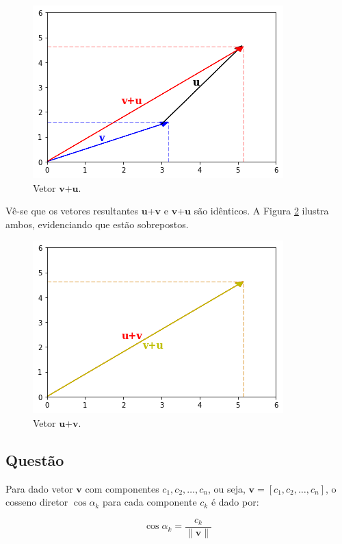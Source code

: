 \documentclass[a4paper,11pt,pagenumber=true]{article}
\newcommand{\vecu}{$\mathbf{u}$}
\newcommand{\vecv}{$\mathbf{v}$}
\newcommand{\vecnorm}[1]{\|\mathbf{#1}\|}
\theoremstyle{mytheor}
\begin{document}
            \begin{figure}[h]
            \centering
               \includegraphics[width=.5\textwidth]{images/q1-3.png}
                \caption{Vetor \vecv+\vecu.}
                \label{fig:q1-3}    
            \end{figure}
            
            Vê-se que os vetores resultantes \vecu+\vecv{} e \vecv+\vecu{} são idênticos. A Figura \ref{fig:q1-4} ilustra ambos, evidenciando que estão sobrepostos.
            
             \begin{figure}[h]
            \centering
               \includegraphics[width=.5\textwidth]{images/q1-4.png}
                \caption{Vetor \vecu+\vecv.}
                \label{fig:q1-4}    
            \end{figure}
        
        \clearpage
    
        \subsection{Questão }
        
            Para dado vetor \vecv{} com componentes $c_1, c_2, \dotsc, c_n$, ou seja,
            $\mathbf{v} = [c_1, c_2, \dotsc, c_n]$, o cosseno diretor $\cos \alpha_k$ para cada componente $c_k$ é dado por: 
            
            \begin{equation}\label{eq:dcos}
                \cos \alpha_k = \frac{c_k}{\vecnorm{v}}
            \end{equation}
            
\end{document}
